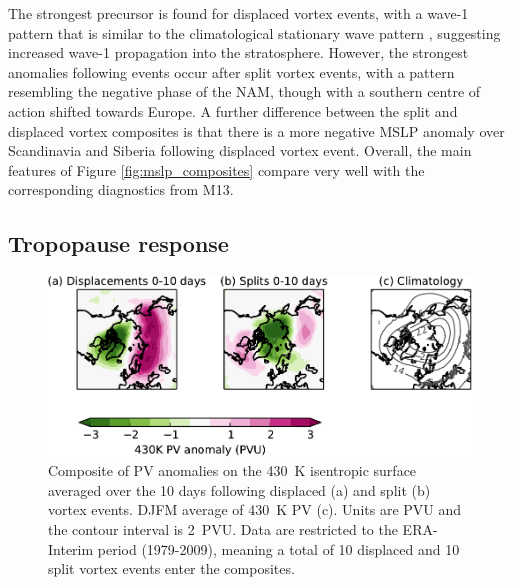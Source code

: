 The strongest precursor is found for displaced vortex events, with a wave-1
pattern that is similar to the climatological stationary wave pattern
\citep[e.g.,][]{Garfinkel2008}, suggesting increased wave-1 propagation into the
stratosphere. However, the strongest anomalies following events occur after
split vortex events, with a pattern resembling the negative phase of the NAM,
though with a southern centre of action shifted towards Europe. A further
difference between the split and displaced vortex composites is that there is a
more negative MSLP anomaly over Scandinavia and Siberia following displaced
vortex event. Overall, the main features of Figure \ref{fig:mslp_composites}
compare very well with the corresponding diagnostics from M13.



\subsection{Tropopause response}

\begin{figure}
 \centering
 \noindent\includegraphics[width=\textwidth]{figures/chapter-moments/PV_430K.pdf}
 \caption[Composites of 430~K PV]{Composite of PV anomalies on the 430~K
   isentropic surface averaged over the 10 days following displaced (a) and
   split (b) vortex events. DJFM average of 430~K PV (c). Units are PVU and the
   contour interval is 2~PVU. Data are restricted to the ERA-Interim period
   (1979-2009), meaning a total of 10 displaced and 10 split vortex events enter
   the composites. }
 \label{fig:430K_PV}
\end{figure}
 

